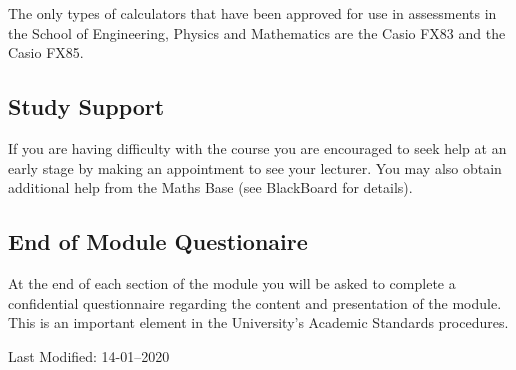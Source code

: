 \documentclass [11pt]{article}
\begin{document}
The only types of calculators that have been approved for use in assessments in the School of
Engineering, Physics and Mathematics are the Casio FX83 and the Casio FX85.

\subsection*{Study Support}

If you are  having difficulty with the course you are encouraged to seek help at an early stage 
by making an appointment to see your lecturer.
You may also obtain additional help from the Maths Base (see BlackBoard for details).


\subsection*{End of Module Questionaire}

At the end of each section of the module you will be asked to complete a 
confidential questionnaire regarding the content and presentation of the 
module. This is an important element in the University's Academic Standards 
procedures. 












\tiny\begin{flushright}
Last Modified: 14-01--2020
     \end{flushright}
\end{document}
